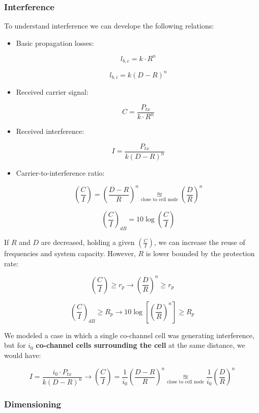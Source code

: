 \documentclass[../main.tex]{subfiles}
\begin{document}
\subsubsection{Interference}

To understand interference we can develope the following relations:

\begin{itemize}
	\item {
		Basic propagation losses:

		$$l_{b, c} = k \cdot R^n$$

		$$l_{b, i} = k (D - R)^n$$
	}
	\item {
		Received carrier signal:

		$$C = \frac {P_{tx}} {k \cdot R^n}$$
	}
	\item {
		Received interference:

		$$I = \frac {P_{tx}} {k (D - R)^n}$$
	}
	\item {
		Carrier-to-interference ratio:

		$$
			\left( \frac{C}{I} \right) = \left( \frac {D - R} {R} \right)^n \underset{\text{close to cell node}}{\approxeq} \left( \frac {D} {R} \right)^n
		$$

		$$
			\left( \frac{C}{I} \right)_{dB} = 10 \log \left( \frac{C}{I} \right)
		$$
	}
\end{itemize}

If $R$ and $D$ are decreased, holding a given $\left( \frac{C}{I} \right)$, we can increase the reuse of frequencies and system capacity. However, $R$ is lower bounded by the protection rate:

$$
	\left( \frac{C}{I} \right) \ge r_p \rightarrow \left( \frac {D} {R} \right)^n \ge r_p
$$

$$
	\left( \frac{C}{I} \right)_{dB} \ge R_p \rightarrow 10 \log \left[ \left( \frac {D} {R} \right)^n \right] \ge R_p
$$

We modeled a case in which a single co-channel cell was generating interference, but for $i_0$ \textbf{co-channel cells surrounding the cell} at the same distance, we would have:

$$
	I = \frac {i_0 \cdot P_{tx}} {k (D - R)^n} \rightarrow \left( \frac{C}{I} \right) = \frac{1}{i_0} \left( \frac {D - R} {R} \right)^n \underset{\text{close to cell node}}{\approxeq} \frac{1}{i_0} \left( \frac {D} {R} \right)^n
$$

\subsubsection{Dimensioning}
\end{document}
